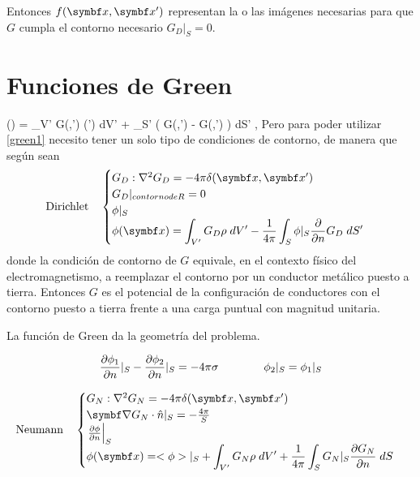 \documentclass[10pt,oneside]{CBFT_book}
\begin{document}
Entonces $f( \vb{x}, \vb{x}' )$ representan la o las imágenes necesarias para que
$G$ cumpla el contorno necesario $G_D|_S=0$.


\section{Funciones de Green}

\be
	\phi() = \int_{V'} G(,') \rho(')  \; dV' +
	 \int_{S'} \left( G(,') -\phi{} G(,') \right)\; dS' ,
	\label{green1}
\ee
Pero para poder utilizar \eqref{green1} necesito tener un solo tipo de condiciones de contorno,
de manera que según sean
\[
	\textrm{Dirichlet} \quad 	\begin{cases}
				G_D : \lapm{G_D} = -4\pi \delta(\vb{x},\vb{x}') \\
				G_D |_{contorno de R} = 0  \\
				\phi|_S \\
				\phi(\vb{x}) = \displaystyle \int_{V'} G_D \rho \; dV' - \frac{1}{4\pi}
				\int_{S} \phi|_S\frac{\partial}{\partial n} G_D \; dS'
			\end{cases}
\]
donde la condición de contorno de $G$ equivale, en el contexto físico del electromagnetismo, a
reemplazar el contorno por un conductor metálico puesto a tierra.
Entonces $G$ es el potencial de la configuración de conductores con el contorno puesto a tierra
frente a una carga puntual con magnitud unitaria.

La función de Green da la geometría del problema.

\[
	\frac{\partial^{\hspace{-0.05em}} {\phi_1}}{\partial {n}^{\hspace{-0.05em}}}|_S - \frac{\partial^{\hspace{-0.05em}} {\phi_2}}{\partial {n}^{\hspace{-0.05em}}}|_S = -4\pi\sigma \qquad \qquad \phi_2|_S = \phi_1|_S
\]

\[
	\textrm{Neumann} \quad 	\begin{cases}
				G_N : \lapm{G_N} = -4\pi \delta(\vb{x},\vb{x}') \\
				\Nabla G_N \cdot \hat{n}|_S = -\frac{4\pi}{S}  \\
				\left.\dpar{\phi}{n}\right|_S \\
				\phi(\vb{x}) = \displaystyle <\phi>|_S + \int_{V'} G_N \rho \; dV' + 
				\frac{1}{4\pi} \int_{S} G_N|_S \dpar{G_N}{n} \; dS
			\end{cases}
\]
\end{document}
